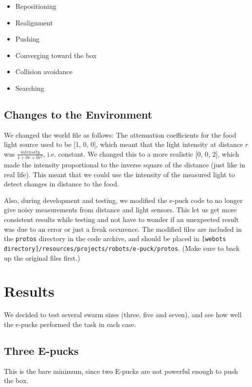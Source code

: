 \documentclass[a4paper,12pt]{article}
\begin{document}
\begin{itemize}
\item{Repositioning}
\item{Realignment}
\item{Pushing}
\item{Converging toward the box}
\item{Collision avoidance}
\item{Searching}
\end{itemize}

\subsection{Changes to the Environment}
We changed the world file as follows: The attenuation coefficients for the food light source used to be [1, 0, 0], which meant that the light intensity at distance $r$ was $\frac{intensity}{1+0 r + 0 r^2}$, i.e. constant. We changed this to a more realistic [0, 0, 2], which made the intensity proportional to the inverse square of the distance (just like in real life). This meant that we could use the intensity of the measured light to detect changes in distance to the food.

Also, during development and testing, we modified the e-puck code to no longer give noisy measurements from distance and light sensors. This let us get more consistent results while testing and not have to wonder if an unexpected result was due to an error or just a freak occurence. The modified files are included in the \texttt{protos} directory in the code archive, and should be placed in \texttt{[webots directory]/resources/projects/robots/e-puck/protos}. (Make sure to back up the original files first.)

\section{Results}
We decided to test several swarm sizes (three, five and seven), and see how well the e-pucks performed the task in each case.

\subsection{Three E-pucks}
This is the bare minimum, since two E-pucks are not powerful enough to push the box.
\end{document}
